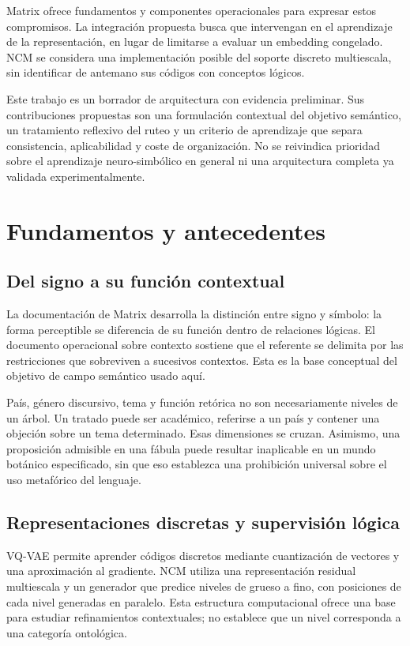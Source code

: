 \documentclass[11pt,a4paper]{article}
\begin{document}
Matrix ofrece fundamentos y componentes operacionales para expresar estos
compromisos. La integración propuesta busca que intervengan en el aprendizaje
de la representación, en lugar de limitarse a evaluar un embedding congelado.
NCM se considera una implementación posible del soporte discreto multiescala,
sin identificar de antemano sus códigos con conceptos lógicos.

Este trabajo es un borrador de arquitectura con evidencia preliminar. Sus
contribuciones propuestas son una formulación contextual del objetivo semántico,
un tratamiento reflexivo del ruteo y un criterio de aprendizaje que separa
consistencia, aplicabilidad y coste de organización. No se reivindica prioridad
sobre el aprendizaje neuro-simbólico en general ni una arquitectura completa ya
validada experimentalmente.

\section{Fundamentos y antecedentes}
\subsection{Del signo a su función contextual}
La documentación de Matrix desarrolla la distinción entre signo y símbolo:
la forma perceptible se diferencia de su función dentro de relaciones lógicas.
El documento operacional sobre contexto sostiene que el referente se delimita
por las restricciones que sobreviven a sucesivos contextos. Esta es la base
conceptual del objetivo de campo semántico usado aquí\cite{matrix}.

País, género discursivo, tema y función retórica no son necesariamente niveles
de un árbol. Un tratado puede ser académico, referirse a un país y contener una
objeción sobre un tema determinado. Esas dimensiones se cruzan. Asimismo, una
proposición admisible en una fábula puede resultar inaplicable en un mundo
botánico especificado, sin que eso establezca una prohibición universal sobre
el uso metafórico del lenguaje.

\subsection{Representaciones discretas y supervisión lógica}
VQ-VAE permite aprender códigos discretos mediante cuantización de vectores y
una aproximación al gradiente\cite{vqvae}. NCM utiliza una representación
residual multiescala y un generador que predice niveles de grueso a fino, con
posiciones de cada nivel generadas en paralelo\cite{ncm}. Esta estructura
computacional ofrece una base para estudiar refinamientos contextuales; no
establece que un nivel corresponda a una categoría ontológica.
\end{document}
